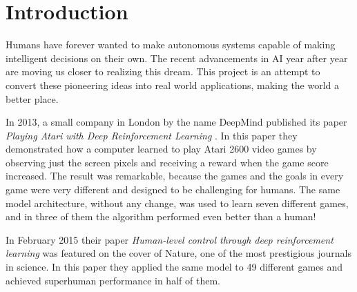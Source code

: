 \documentclass[12pt]{extreport}
\begin{document}
\tableofcontents



\chapter{Introduction}


Humans have forever wanted to make autonomous systems capable of making intelligent decisions on their own. The recent advancements in AI year after year are moving us closer to realizing this dream. This project is an attempt to convert these pioneering ideas into real world applications, making the world a better place.

In 2013, a small company in London by the name DeepMind published its paper \emph{Playing Atari with Deep Reinforcement Learning} \cite{mnih2013atari}.
In this paper they demonstrated how a computer learned to play Atari 2600 video games by observing just the screen pixels and receiving a reward when the game score increased. The result was remarkable, because the games and the goals in every game were very different and designed to be challenging for humans. The same model architecture, without any change, was used to learn seven different games, and in three of them the algorithm performed even better than a human!

In February 2015 their paper \emph{Human-level control through deep reinforcement learning} \cite{mnih2015nature} was featured on the cover of Nature, one of the most prestigious journals in science. In this paper they applied the same model to 49 different games and achieved superhuman performance in half of them.
\end{document}
